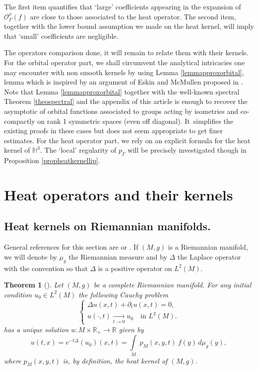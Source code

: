 \documentclass[JEP,XML,SOM,Unicode,NoFloatCountersInSection,published]{cedram}
\let\mathcal\mathscr
\theoremstyle{plain}
\newtheorem{theoreme}[equation]{Theorem}
\theoremstyle{definition}
\newcommand{\HH}{\mathbb{H}}
\newcommand{\RR}{\mathbb{R}}
\newcommand{\inte}[1]{\underset{#1}{\int}}
\newcommand{\tends}[1]{\underset{#1}{\longrightarrow}}
\begin{document}
The first item quantifies that `large' coefficients appearing in the expansion of $\mathcal{O}^{\rho}_{\Gamma}(f)$ are close to those associated to the heat operator. The second item, together with the lower bound assumption we made on the heat kernel, will imply that `small' coefficients are negligible.

The operators comparison done, it will remain to relate them with their kernels. For the orbital operator part, we shall circumvent the analytical intricacies one may encounter with non smooth kernels by using Lemma \ref{lemmapproxorbital}, lemma which is inspired by an argument of Eskin and McMullen proposed in \cite{arteskinmac}. Note that Lemma \ref{lemmapproxorbital} together with the well-known spectral Theorem \ref{theospectral} and the appendix of this article is enough to recover the asymptotic of orbital functions associated to groups acting by isometries and co-compactly on rank 1 symmetric spaces (even off diagonal). It~simplifies the existing proofs in these cases but does not seem appropriate to get finer estimates. For the heat operator part, we rely on an explicit formula for the heat kernel of $\HH^3$. The `local' regularity of $p_{\Gamma}$ will be precisely investigated though in Proposition \ref{propheatkernellip}.

\section{Heat operators and their kernels}

\label{secheatoperator}

\subsection{Heat kernels on Riemannian manifolds.} General references for this section are \cite{livrechavel} or \cite{bookgrigorheatkernel}. If $(M,g)$ is a Riemannian manifold, we will denote by $\mu_g$ the Riemannian measure and by $\Delta$ the Laplace operator with the convention so that $\Delta$ is a positive operator on $L^2(M)$.

\begin{theoreme}[{\cite[Cor.\,4.11, p.\,117]{bookgrigorheatkernel}}]
\label{theocauchyprobleml1}
Let $(M,g)$ be a complete Riemannian manifold. For any initial condition $u_0 \in L^2(M)$ the following Cauchy problem\vspace*{-3pt}
\begin{equation}
\label{eq Cauchy problem1}
\begin{cases}
\Delta u(x,t) + \partial_t u(x,t) = 0, \\
u(\cdot,t) \tends{t \to 0} u_0 \quad \text{in } L^2(M).
\end{cases}
\end{equation}
has a unique solution $u : M \times \RR_+ \to \RR$ given by\vspace*{-3pt}
\[
u(t,x) = e^{-t \Delta}(u_0)(x,t) = \inte{M} \ p_M(x,y,t) \ f(y) \,d \mu_{g}(y),
\]
where $p_M(x,y,t)$ is, by definition, the \emph{heat kernel} of $(M,g)$.
\end{theoreme}
\end{document}
